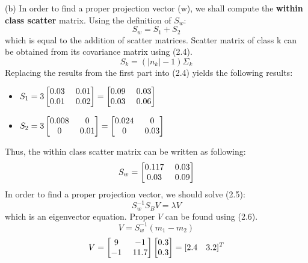 \documentclass[12pt]{article}
\numberwithin{equation}{section}
\numberwithin{table}{section}
\numberwithin{figure}{section}
\begin{document}
(b) In order to find a proper projection vector (w), we shall compute the \textbf{within class scatter} matrix. Using the definition of $S_w$:
\begin{equation}
	S_w = S_1 + S_2
\end{equation}
which is equal to the addition of scatter matrices. Scatter matrix of class k can be obtained from its covariance matrix using (2.4).
\begin{equation}
	S_k = (|n_k| - 1) \Sigma_k
\end{equation}
Replacing the results from the first part into (2.4) yields the following results:
\begin{itemize}
	\item $S_1 = 3 \renewcommand\arraystretch{1}
	\setlength\arraycolsep{6.5pt}\begin{bmatrix}
	0.03 & 0.01\\
	0.01 & 0.02\\
	\end{bmatrix} = \renewcommand\arraystretch{1}
	\setlength\arraycolsep{6.5pt}\begin{bmatrix}
	0.09 & 0.03\\
	0.03 & 0.06\\
	\end{bmatrix} $
	 
	\item $S_2 = 3 \renewcommand\arraystretch{1}
	\setlength\arraycolsep{6.5pt}\begin{bmatrix}
	0.008 & 0\\
	0 & 0.01\\
	\end{bmatrix} = \renewcommand\arraystretch{1}
	\setlength\arraycolsep{6.5pt}\begin{bmatrix}
	0.024 & 0\\
	0 & 0.03\\
	\end{bmatrix} $
\end{itemize}
Thus, the within class scatter matrix can be written as following:
$$
	S_w = \renewcommand\arraystretch{1}
	\setlength\arraycolsep{6.5pt}\begin{bmatrix}
	0.117 & 0.03\\
	0.03 & 0.09\\
	\end{bmatrix}
$$
In order to find a proper projection vector, we should solve (2.5):
\begin{equation}
	S_w^{-1}S_B V = \lambda V
\end{equation}
which is an eigenvector equation. Proper $V$ can be found using (2.6).
\begin{equation}
	V = S_w^{-1}(m_1 - m_2)
\end{equation}
$$
	V = \renewcommand\arraystretch{1}
	\setlength\arraycolsep{6.5pt}\begin{bmatrix}
	9 & -1\\
	-1 & 11.7\\
	\end{bmatrix}\begin{bmatrix}
	0.3\\
	0.3\\
	\end{bmatrix} = [2.4 \ \ \ 3.2]^T
$$
\end{document}
